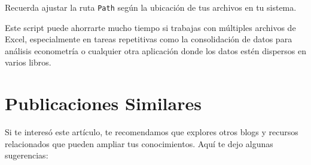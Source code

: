 \documentclass[
  jou,
  floatsintext,
  longtable,
  a4paper,
  nolmodern,
  notxfonts,
  notimes,
  colorlinks=true,linkcolor=blue,citecolor=blue,urlcolor=blue]{apa7}
\begin{document}
Recuerda ajustar la ruta \texttt{Path} según la ubicación de tus
archivos en tu sistema.

Este script puede ahorrarte mucho tiempo si trabajas con múltiples
archivos de Excel, especialmente en tareas repetitivas como la
consolidación de datos para análisis econometría o cualquier otra
aplicación donde los datos estén dispersos en varios libros.

\section{Publicaciones Similares}\label{publicaciones-similares}

Si te interesó este artículo, te recomendamos que explores otros blogs y
recursos relacionados que pueden ampliar tus conocimientos. Aquí te dejo
algunas sugerencias:
\end{document}
